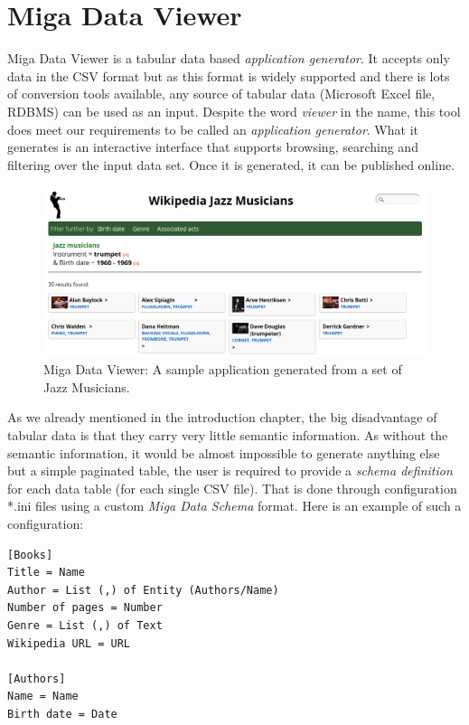 \section{Miga Data Viewer}

Miga Data Viewer is a tabular data based \emph{application generator}. It accepts only data in the CSV format but as this format is widely supported and there is lots of conversion tools available, any source of tabular data (Microsoft Excel file, RDBMS) can be used as an input. Despite the word \emph{viewer} in the name, this tool does meet our requirements to be called an \emph{application generator}. What it generates is an interactive interface that supports browsing, searching and filtering over the input data set. Once it is generated, it can be published online.

\begin{figure}
	\centering
	\includegraphics[width=140mm]{img/02_miga_data_viewer.png}
	\caption{Miga Data Viewer: A sample application generated from a set of Jazz Musicians.}
	\label{fig:miga-data-viewer}
\end{figure}

As we already mentioned in the introduction chapter, the big disadvantage of tabular data is that they carry very little semantic information. As without the semantic information, it would be almost impossible to generate anything else but a simple paginated table, the user is required to provide a \emph{schema definition} for each data table (for each single CSV file). That is done through configuration *.ini files using a custom \emph{Miga Data Schema} format. Here is an example of such a configuration:

\scriptsize
\begin{verbatim}
[Books]
Title = Name
Author = List (,) of Entity (Authors/Name)
Number of pages = Number
Genre = List (,) of Text
Wikipedia URL = URL

[Authors]
Name = Name
Birth date = Date
\end{verbatim}
\normalsize

